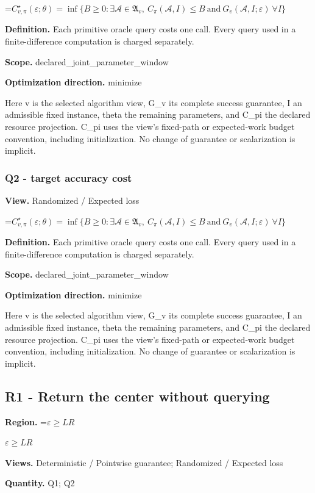 \documentclass[10pt,a4paper]{article}
\newcommand{\AtlasMath}[1]{\par\begingroup\centering\setbox0=\hbox{$\displaystyle #1$}\ifdim\wd0>1.4\linewidth\typeout{ATLAS WIDE FORMULA: \the\wd0}\fi\ifdim\wd0>\linewidth\resizebox{\linewidth}{!}{\box0}\else\box0\fi\par\endgroup}
\newcommand{\AtlasInlineMath}[1]{\begingroup\setbox0=\hbox{$#1$}\ifdim\wd0>.4\linewidth\endgroup\AtlasMath{#1}\else\endgroup$#1$\fi}
\begin{document}
\AtlasMath{C^\star_{v,\pi}(\varepsilon;\theta)=\inf\{B\ge0:\exists\mathcal A\in\mathfrak A_v,\ C_\pi(\mathcal A,I)\le B\ \text{and}\ G_v(\mathcal A,I;\varepsilon)\ \forall I\}}
\textbf{Definition.} Each primitive oracle query costs one call. Every query used in a finite-difference computation is charged separately.

\textbf{Scope.} declared\_joint\_parameter\_window

\textbf{Optimization direction.} minimize

Here v is the selected algorithm view, G\_v its complete success guarantee, I an admissible fixed instance, theta the remaining parameters, and C\_pi the declared resource projection. C\_pi uses the view's fixed-path or expected-work budget convention, including initialization. No change of guarantee or scalarization is implicit.

\subsubsection{Q2 - target accuracy cost}
\textbf{View.} Randomized / Expected loss

\AtlasMath{C^\star_{v,\pi}(\varepsilon;\theta)=\inf\{B\ge0:\exists\mathcal A\in\mathfrak A_v,\ C_\pi(\mathcal A,I)\le B\ \text{and}\ G_v(\mathcal A,I;\varepsilon)\ \forall I\}}
\textbf{Definition.} Each primitive oracle query costs one call. Every query used in a finite-difference computation is charged separately.

\textbf{Scope.} declared\_joint\_parameter\_window

\textbf{Optimization direction.} minimize

Here v is the selected algorithm view, G\_v its complete success guarantee, I an admissible fixed instance, theta the remaining parameters, and C\_pi the declared resource projection. C\_pi uses the view's fixed-path or expected-work budget convention, including initialization. No change of guarantee or scalarization is implicit.

\subsection{R1 - Return the center without querying}
\textbf{Region.} \AtlasInlineMath{\varepsilon\ge LR}

\textbf{Views.} Deterministic / Pointwise guarantee; Randomized / Expected loss

\textbf{Quantity.} Q1; Q2
\end{document}
